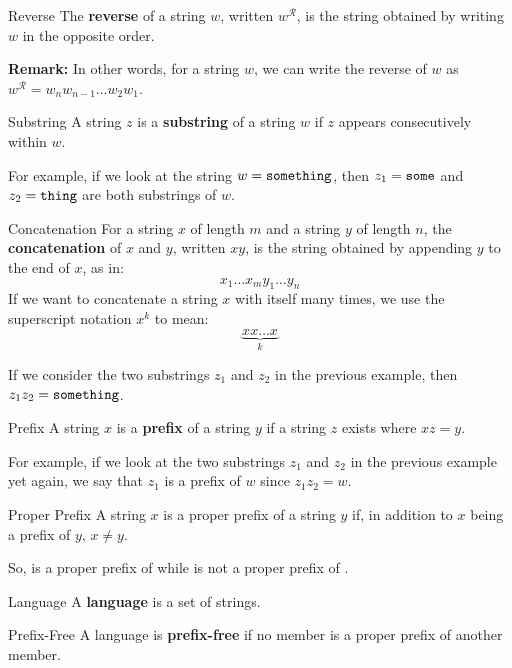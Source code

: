 \documentclass[letterpaper]{article}
\begin{document}
\begin{definition}{Reverse}{}
    The \textbf{reverse} of a string $w$, written $w^{\mathcal{R}}$, is the string obtained by writing $w$ in the opposite order.
\end{definition}
\textbf{Remark:} In other words, for a string $w$, we can write the reverse of $w$ as $w^{\mathcal{R}} = w_n w_{n - 1} \dots w_{2} w_{1}$. 

\begin{definition}{Substring}{}
    A string $z$ is a \textbf{substring} of a string $w$ if $z$ appears consecutively within $w$.
\end{definition}
For example, if we look at the string $w = \texttt{something}$, then $z_1 = \texttt{some}$ and $z_2 = \texttt{thing}$ are both substrings of $w$. 

\begin{definition}{Concatenation}{}
    For a string $x$ of length $m$ and a string $y$ of length $n$, the \textbf{concatenation} of $x$ and $y$, written $xy$, is the string obtained by appending $y$ to the end of $x$, as in: 
    \[x_1 \dots x_m y_1 \dots y_n\]
    If we want to concatenate a string $x$ with itself many times, we use the superscript notation $x^k$ to mean: 
    \[\underbrace{xx \dots x}_{k}\]
\end{definition}
If we consider the two substrings $z_1$ and $z_2$ in the previous example, then $z_1 z_2 = \texttt{something}$. 


\begin{definition}{Prefix}{}
    A string $x$ is a \textbf{prefix} of a string $y$ if a string $z$ exists where $xz = y$.
\end{definition}
For example, if we look at the two substrings $z_1$ and $z_2$ in the previous example yet again, we say that $z_1$ is a prefix of $w$ since $z_1 z_2 = w$. 

\begin{definition}{Proper Prefix}{}
    A string $x$ is a proper prefix of a string $y$ if, in addition to $x$ being a prefix of $y$, $x \neq y$.
\end{definition}
So,  is a proper prefix of  while  is not a proper prefix of .

\begin{definition}{Language}{}
    A \textbf{language} is a set of strings. 
\end{definition}

\begin{definition}{Prefix-Free}{}
    A language is \textbf{prefix-free} if no member is a proper prefix of another member.
\end{definition}
\end{document}
